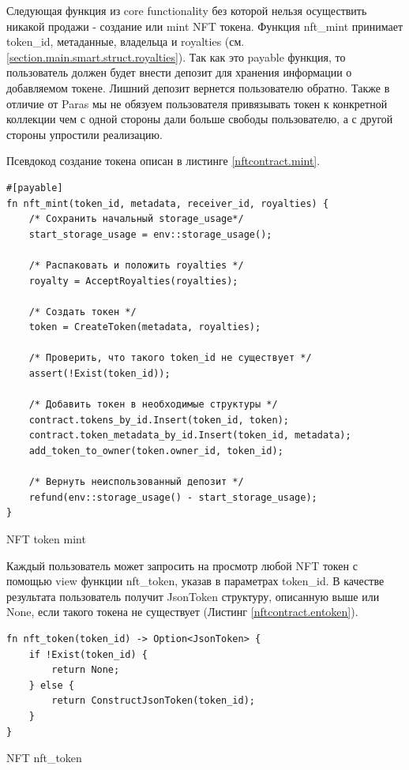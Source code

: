 Следующая функция из core functionality без которой нельзя осуществить никакой продажи - создание или mint NFT токена. Функция nft\_mint принимает token\_id, метаданные, владельца и royalties (см. {\color{blue}\ref{section.main.smart.struct.royalties}}).
Так как это payable функция, то пользователь должен будет внести депозит для хранения информации о добавляемом токене. Лишний депозит вернется пользователю обратно.
Также в отличие от Paras мы не обязуем пользователя привязывать токен к конкретной коллекции чем с одной стороны дали больше свободы пользователю, а с другой стороны упростили реализацию.

Псевдокод создание токена описан в листинге {\color{blue}\ref{nftcontract.mint}}.

\begin{listing}
\begin{verbatim}
#[payable]
fn nft_mint(token_id, metadata, receiver_id, royalties) {
    /* Сохранить начальный storage_usage*/
    start_storage_usage = env::storage_usage();

    /* Распаковать и положить royalties */
    royalty = AcceptRoyalties(royalties);

    /* Создать токен */
    token = CreateToken(metadata, royalties);

    /* Проверить, что такого token_id не существует */
    assert(!Exist(token_id));

    /* Добавить токен в необходимые структуры */
    contract.tokens_by_id.Insert(token_id, token);
    contract.token_metadata_by_id.Insert(token_id, metadata);
    add_token_to_owner(token.owner_id, token_id);

    /* Вернуть неиспользованный депозит */
    refund(env::storage_usage() - start_storage_usage);
}
\end{verbatim}
\caption{NFT token mint}
\label{nftcontract.mint}
\end{listing}

Каждый пользователь может запросить на просмотр любой NFT токен с помощью view функции nft\_token, указав в параметрах token\_id.
В качестве результата пользователь получит JsonToken структуру, описанную выше или None, если такого токена не существует (Листинг {\color{blue}\ref{nftcontract.entoken}}).

\begin{listing}
\begin{verbatim}
fn nft_token(token_id) -> Option<JsonToken> {
    if !Exist(token_id) {
        return None;
    } else {
        return ConstructJsonToken(token_id);
    }
}
\end{verbatim}
\caption{NFT nft\_token}
\label{nftcontract.entoken}
\end{listing}

